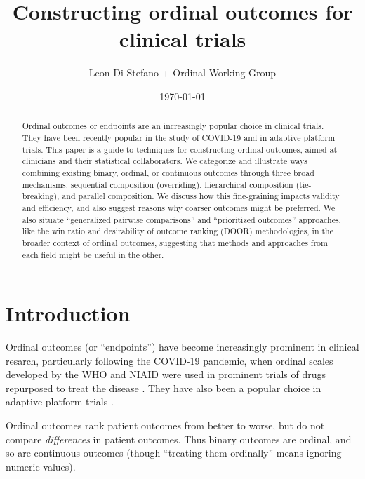 \documentclass[
  11pt,
  fleqn
]{article}
\title{Constructing ordinal outcomes for clinical trials}
\author{Leon Di Stefano + Ordinal
Working Group}
\date{\today}
\begin{document}
\maketitle

\begin{abstract}
  Ordinal outcomes or endpoints are an increasingly popular choice in
  clinical trials.
  They have been recently popular in the study of COVID-19 and in
  adaptive platform
  trials.
  This paper is a guide to techniques for constructing ordinal
  outcomes, aimed at clinicians and their statistical collaborators.
  We categorize and illustrate ways combining existing binary,
  ordinal, or continuous
  outcomes through three broad mechanisms: sequential composition
  (overriding), hierarchical composition (tie-breaking), and parallel
  composition.
  We discuss how this fine-graining impacts validity and efficiency, and also
  suggest reasons why coarser outcomes might be preferred.
  We also situate ``generalized pairwise comparisons'' and
  ``prioritized outcomes'' approaches, like the win
  ratio and desirability of outcome
  ranking (DOOR) methodologies, in the broader context of ordinal
  outcomes, suggesting that methods and approaches from each field
  might be useful in the other.
\end{abstract}

\tableofcontents
\newpage

\section{Introduction}

Ordinal outcomes (or ``endpoints'') have become increasingly
prominent in clinical
resarch, particularly following the COVID-19 pandemic, when ordinal
scales developed by the WHO and NIAID were used in prominent trials
of drugs repurposed to treat the disease . They have also
been a popular choice in adaptive platform trials .

Ordinal outcomes rank patient outcomes from better to worse, but do
not compare \emph{differences} in patient outcomes. Thus binary
outcomes are ordinal, and so are continuous outcomes (though
``treating them ordinally'' means ignoring numeric values).
\end{document}
